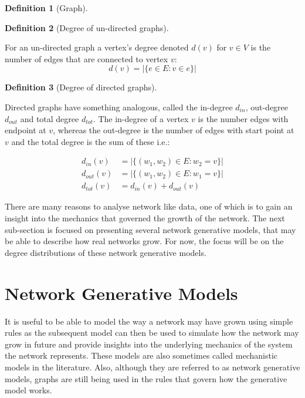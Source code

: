 \documentclass[
  10pt,
  a4paper,
]{scrreprt}
\theoremstyle{plain}
\theoremstyle{plain}
\theoremstyle{plain}
\theoremstyle{definition}
\newtheorem{definition}{Definition}[section]
\theoremstyle{remark}
\begin{document}
{\begin{definition}[Graph]
\end{definition}

\begin{definition}[Degree of un-directed
graphs]\protect\hypertarget{def-deg}{}\label{def-deg}

For an un-directed graph a vertex's degree denoted \(d(v)\) for
\(v\in V\) is the number of edges that are connected to vertex \(v\): \[
d(v) = |\{e\in E : v \in e\}|
\]

\end{definition}

\begin{definition}[Degree of directed
graphs]\protect\hypertarget{def-dirdeg}{}\label{def-dirdeg}

Directed graphs have something analogous, called the in-degree
\(d_{in}\), out-degree \(d_{out}\) and total degree \(d_{tot}\). The
in-degree of a vertex \(v\) is the number edges with endpoint at \(v\),
whereas the out-degree is the number of edges with start point at \(v\)
and the total degree is the sum of these i.e.:

\begin{align*}
d_{in}(v)&= |\{(w_1,w_2)\in E: w_2=v \}|\\
d_{out}(v) &= |\{(w_1,w_2)\in E: w_1=v \}|\\
d_{tot}(v) &= d_{in}(v) + d_{out}(v)
\end{align*}

\end{definition}

There are many reasons to analyse network like data, one of which is to
gain an insight into the mechanics that governed the growth of the
network. The next sub-section is focused on presenting several network
generative models, that may be able to describe how real networks grow.
For now, the focus will be on the degree distributions of these network
generative models.

\hypertarget{sec-gen}{%
\section{Network Generative Models}\label{sec-gen}}

It is useful to be able to model the way a network may have grown using
simple rules as the subsequent model can then be used to simulate how
the network may grow in future and provide insights into the underlying
mechanics of the system the network represents. These models are also
sometimes called mechanistic models in the literature. Also, although
they are referred to as network generative models, graphs are still
being used in the rules that govern how the generative model works.

}
\end{document}
